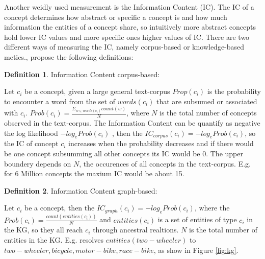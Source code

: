 \documentclass[pdftex,a4paper,12pt]{scrartcl}
\theoremstyle{definition}
\newtheorem{definition}{Definition}[section]
\begin{document}
Another weidly used measurement is the Information Content (IC). The IC of a concept determines how abstract or specific a concept is and how much information the entities of a concept share, so intuitively more abstract concepts hold lower IC values and more specific ones higher values of IC. There are two different ways of measuring the IC, namely corpus-based or knowledge-based metics., \citet{zhu_computing_2017} propose the following definitions: 
\begin{definition}{Information Content corpus-based:}

Let $c_i$ be a concept, given a large general text-corpus $Prop(c_i)$ is the probability to encounter a word from the set of $words(c_i)$ that are subsumed or associated with $c_i$. $Prob(c_i)= \frac{\Sigma_{w\in words(c_i)} count(w)}{N}$, where $N$ is the total number of concepts observed in the text-corpus. The Information Content can be quantify as negative the log likelihood $-log_e Prob(c_i)$ \citep{resnik_using_nodate}, then the $IC_{corpus}(c_i) = -log_e Prob(c_i)$, so the IC of concept $c_i$ increases when the probability decreases and if there would be one concept subsumming all other concepts its IC would be $0$. The upper boundery depends on  $N$, the occurences of all concepts in the text-corpus. E.g. for 6 Million concepts the maxium IC would be about 15. 
\end{definition}
\begin{definition}{Information Content graph-based:}

Let $c_i$ be a concept, then the $IC_{graph}(c_i) = -log_e Prob(c_i)$, where the $Prob(c_i) = \frac{count(entities(c_i))}{N}$ and $entities(c_i)$ is a set of entities of type $c_i$ in the KG, so they all reach $c_i$ through ancestral realtions. $N$ is the total number of entities in the KG. E.g. resolves $entities(two-wheeler)$ to ${two-wheeler, bicycle, motor-bike, race-bike}$, as show in Figure \ref{fig:kg}. 
\end{definition}

\end{document}
